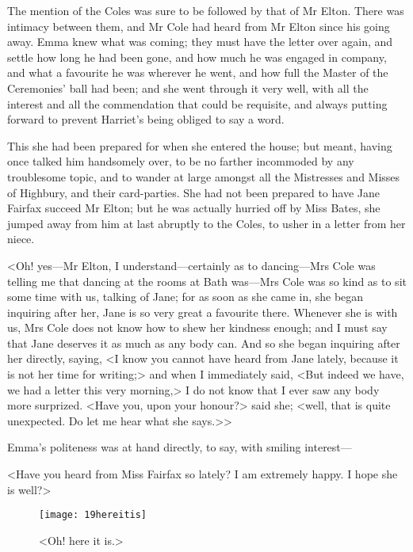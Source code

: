 The mention of the Coles was sure to be followed by that of Mr Elton. There was intimacy between them, and Mr Cole had heard from Mr Elton since his going away. Emma knew what was coming; they must have the letter over again, and settle how long he had been gone, and how much he was engaged in company, and what a favourite he was wherever he went, and how full the Master of the Ceremonies' ball had been; and she went through it very well, with all the interest and all the commendation that could be requisite, and always putting forward to prevent Harriet's being obliged to say a word.

This she had been prepared for when she entered the house; but meant, having once talked him handsomely over, to be no farther incommoded by any troublesome topic, and to wander at large amongst all the Mistresses and Misses of Highbury, and their card-parties. She had not been prepared to have Jane Fairfax succeed Mr Elton; but he was actually hurried off by Miss Bates, she jumped away from him at last abruptly to the Coles, to usher in a letter from her niece.

<Oh! yes—Mr Elton, I understand—certainly as to dancing—Mrs Cole was telling me that dancing at the rooms at Bath was—Mrs Cole was so kind as to sit some time with us, talking of Jane; for as soon as she came in, she began inquiring after her, Jane is so very great a favourite there. Whenever she is with us, Mrs Cole does not know how to shew her kindness enough; and I must say that Jane deserves it as much as any body can. And so she began inquiring after her directly, saying, <I know you cannot have heard from Jane lately, because it is not her time for writing;> and when I immediately said, <But indeed we have, we had a letter this very morning,> I do not know that I ever saw any body more surprized. <Have you, upon your honour?> said she; <well, that is quite unexpected. Do let me hear what she says.>>

Emma's politeness was at hand directly, to say, with smiling interest—

<Have you heard from Miss Fairfax so lately? I am extremely happy. I hope she is well?>

\begin{figure}[tbph]
\centering
\texttt{[image: 19hereitis]}
\caption{<Oh! here it is.>}
\end{figure}

